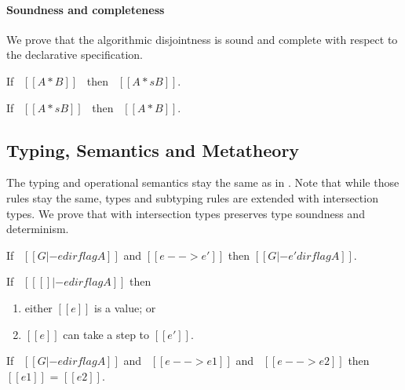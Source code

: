 \paragraph{Soundness and completeness}

We prove that the algorithmic disjointness is sound and complete with respect to
the declarative specification.

\begin{lemma}
  If \ $[[A * B]]$ \ then \ $[[A *s B]]$.
\label{lemma:inter:disj-sound}
\end{lemma}

\begin{lemma}
  If \ $[[A *s B]]$ \ then \ $[[A * B]]$.
\label{lemma:inter:disj-complete}
\end{lemma}

\subsection{Typing, Semantics and Metatheory}

The typing and operational semantics stay the same as in . Note
that while those rules stay the same, types and subtyping rules are extended
with intersection types.
We prove that \cal with intersection types preserves type soundness and determinism.

\begin{lemma}
\label{lemma:inter:preservation}
  If \ $[[G |- e dirflag A]]$ and $[[e --> e']]$ then $[[G |- e' dirflag A]]$.
\end{lemma}

\begin{lemma}[Progress]
\label{lemma:inter:progress}
If \ $[[ [] |- e dirflag A]]$ then
 \begin{enumerate}
  \item either $[[e]]$ is a value; or
  \item $[[e]]$ can take a step to $[[e']]$.
  \end{enumerate}
\end{lemma}

\begin{theorem}[Determinism]
\label{lemma:inter:determinism}
  If \ $[[G |- e dirflag A]]$ and \ $[[e --> e1]]$ and \ $[[e --> e2]]$ then $[[e1]]$ = $[[e2]]$.
\end{theorem}

\begin{comment}
\begin{lemma}[Substitution]
\label{lemma:inter:substitution}
  If \ $[[G, x:B , G1 |- e dirflag A]]$ \ and \ $[[G |- e' => B]]$
  then \ $[[G, G1 |- e [ x ~> e' ] dirflag A]]$
\end{lemma}
\end{comment}


